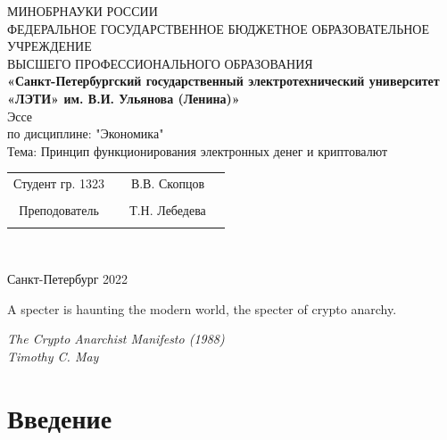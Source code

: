 \documentclass[12pt,a4paper]{article}
\begin{document}
\begin{center}
\hfill \break
\large{МИНОБРНАУКИ РОССИИ}\\
\footnotesize{ФЕДЕРАЛЬНОЕ ГОСУДАРСТВЕННОЕ БЮДЖЕТНОЕ ОБРАЗОВАТЕЛЬНОЕ УЧРЕЖДЕНИЕ}\\ 
\footnotesize{ВЫСШЕГО ПРОФЕССИОНАЛЬНОГО ОБРАЗОВАНИЯ}\\
\small{\textbf{«Санкт-Петербургский государственный
электротехнический университет
	«ЛЭТИ» им. В.И. Ульянова (Ленина)»}}\\
\hfill \break
\hfill \break
 \hfill \break
\hfill\break
\hfill \break
\hfill \break
\hfill \break
\large{Эссе \\

\hfill \break
	по дисциплине: "Экономика"\\
\hfill \break
	Тема: Принцип функционирования электронных денег и криптовалют}\\
\hfill \break
\hfill \break
\hfill \break
\hfill \break
\end{center}
 
\hfill \break
\hfill \break
\hfill \break
\hfill \break
\hfill \break
\hfill \break
\hfill \break
\hfill \break
\hfill \break
\hfill \break
\hfill \break
\hfill \break
\hfill \break
\hfill \break
 
\normalsize{ 
\begin{tabular}{cccc}
Студент гр. 1323 & \underline{\hspace{3cm}} & В.В. Скопцов \\\\
Преподователь & \underline{\hspace{3cm}} & Т.Н. Лебедева \\\\
\end{tabular}
}\\
\hfill \break
\hfill \break
\begin{center}
	Санкт-Петербург 2022
\end{center}
\thispagestyle{empty} %
 
\newpage 

\tableofcontents

\newpage


\epigraph{A specter is haunting the modern world, the specter of crypto anarchy.}
{\textit{The Crypto Anarchist Manifesto (1988)\\Timothy C. May}}

\section{Введение}
\end{document}

